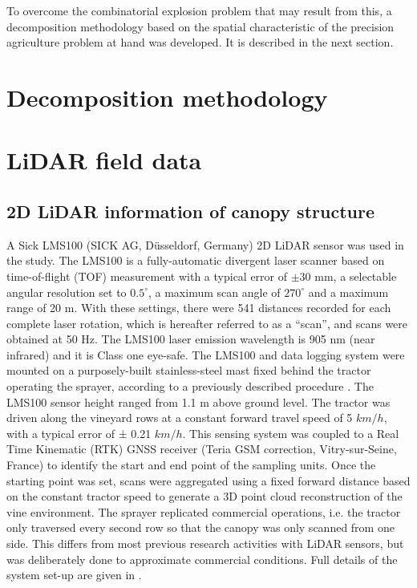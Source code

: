 \documentclass[preprint,3p,times,twocolumn]{elsarticle}
\begin{document}
To overcome the combinatorial explosion problem that may result from this, a decomposition methodology based on the spatial characteristic of the precision agriculture problem at hand was developed. It is described in the next section.


\section{Decomposition methodology}



\section{LiDAR field data}
\label{lidar}


\subsection{2D LiDAR information of canopy structure}
A Sick LMS100 (SICK AG, Düsseldorf, Germany) 2D LiDAR sensor was used in the study. The LMS100 is a fully-automatic divergent laser scanner based on time-of-flight (TOF) measurement with a typical error of $\pm 30$ mm, a selectable angular resolution set to $0.5^{\circ}$, a maximum scan angle of $270^{\circ}$ and a maximum range of 20 m. With these settings, there were 541 distances recorded for each complete laser rotation, which is hereafter referred to as a “scan”, and scans were obtained at 50 Hz. The LMS100 laser emission wavelength is 905 nm (near infrared) and it is Class one eye-safe. The LMS100 and data logging system were mounted on a purposely-built stainless-steel mast fixed behind the tractor operating the sprayer, according to a previously described procedure \cite{cheraiet2020algorithm}. The LMS100 sensor height ranged from 1.1 m above ground level. The tractor was driven along the vineyard rows at a constant forward travel speed of 5 $km/h$, with a typical error of ± 0.21 $km/h$.
This sensing system was coupled to a Real Time Kinematic (RTK) GNSS receiver (Teria GSM correction, Vitry-sur-Seine, France) to identify the start and end point of the sampling units. Once the starting point was set, scans were aggregated using a fixed forward distance based on the constant tractor speed to generate a 3D point cloud reconstruction of the vine environment. The sprayer replicated commercial operations, i.e. the tractor only traversed every second row so that the canopy was only scanned from one side. This differs from most previous research activities with LiDAR sensors, but was deliberately done to approximate commercial conditions. Full details of the system set-up are given in \cite{cheraiet2020algorithm}.%
\end{document}
